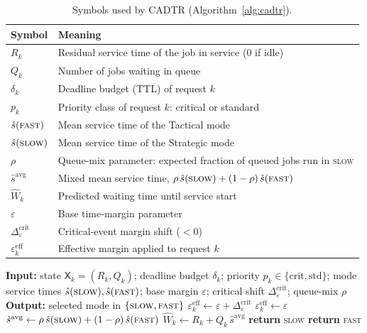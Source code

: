 \documentclass[fleqn,12pt,lineno]{wlpeerj}
\begin{document}
\begin{table}[t]
\centering
\caption{Symbols used by CADTR (Algorithm~\ref{alg:cadtr}).}
\label{tab:cadtr_symbols}
\begin{tabular}{ll}
\toprule
Symbol & Meaning \\
\midrule
$R_k$ & Residual service time of the job in service ($0$ if idle) \\
$Q_k$ & Number of jobs waiting in queue \\
$\delta_k$ & Deadline budget (TTL) of request $k$ \\
$p_k$ & Priority class of request $k$: critical or standard \\
$\hat{s}(\textsc{fast})$ & Mean service time of the Tactical mode \\
$\hat{s}(\textsc{slow})$ & Mean service time of the Strategic mode \\
$\rho$ & Queue-mix parameter: expected fraction of queued jobs run in \textsc{slow} \\
$\hat{s}^{\mathrm{avg}}$ & Mixed mean service time, $\rho\,\hat{s}(\textsc{slow})+(1-\rho)\,\hat{s}(\textsc{fast})$ \\
$\widehat{W}_k$ & Predicted waiting time until service start \\
$\varepsilon$ & Base time-margin parameter \\
$\Delta_{\varepsilon}^{\mathrm{crit}}$ & Critical-event margin shift ($<0$) \\
$\varepsilon_k^{\mathrm{eff}}$ & Effective margin applied to request $k$ \\
\bottomrule
\end{tabular}
\end{table}

\begin{algorithm}[t]
\caption{CADTR (Context-Aware Dynamic Tool Resolution) at request arrival.}
\label{alg:cadtr}
\begin{algorithmic}[1]
\STATE \textbf{Input:} state $\mathsf{X}_k=(R_k,Q_k)$; deadline budget $\delta_k$; priority $p_k \in \{\text{crit}, \text{std}\}$; mode service times $\hat{s}(\textsc{slow}), \hat{s}(\textsc{fast})$; base margin $\varepsilon$; critical shift $\Delta_{\varepsilon}^{\mathrm{crit}}$; queue-mix $\rho$
\STATE \textbf{Output:} selected mode in $\{\textsc{slow},\textsc{fast}\}$
    \STATE $\varepsilon_k^{\mathrm{eff}} \gets \varepsilon + \Delta_{\varepsilon}^{\mathrm{crit}}$
\ELSE
    \STATE $\varepsilon_k^{\mathrm{eff}} \gets \varepsilon$
\ENDIF
\STATE $\hat{s}^{\mathrm{avg}} \gets \rho\,\hat{s}(\textsc{slow}) + (1-\rho)\,\hat{s}(\textsc{fast})$
\STATE $\widehat{W}_k \gets R_k + Q_k\,\hat{s}^{\mathrm{avg}}$
    \STATE \textbf{return} \textsc{slow} 
\ELSE
    \STATE \textbf{return} \textsc{fast} 
\ENDIF
\end{algorithmic}
\end{algorithm}
\end{document}
